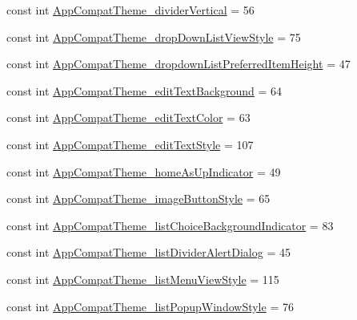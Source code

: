 \begin{DoxyCompactItemize}
\item 
const int \mbox{\hyperlink{class_f_w_p_s___app_1_1_droid_1_1_resource_1_1_styleable_a70f58c052478aade46a7b1e386130b65}{App\+Compat\+Theme\+\_\+divider\+Vertical}} = 56
\item 
const int \mbox{\hyperlink{class_f_w_p_s___app_1_1_droid_1_1_resource_1_1_styleable_ada67ea1a5af4f4efebdfa47a5ff276b2}{App\+Compat\+Theme\+\_\+drop\+Down\+List\+View\+Style}} = 75
\item 
const int \mbox{\hyperlink{class_f_w_p_s___app_1_1_droid_1_1_resource_1_1_styleable_a87d64a1aeff0163acd3010a12c33afe1}{App\+Compat\+Theme\+\_\+dropdown\+List\+Preferred\+Item\+Height}} = 47
\item 
const int \mbox{\hyperlink{class_f_w_p_s___app_1_1_droid_1_1_resource_1_1_styleable_a04dbe0ad4911a9a48e3a5ec680164e4c}{App\+Compat\+Theme\+\_\+edit\+Text\+Background}} = 64
\item 
const int \mbox{\hyperlink{class_f_w_p_s___app_1_1_droid_1_1_resource_1_1_styleable_a1ebf1fe735ff9d4768ccfa0d90905de7}{App\+Compat\+Theme\+\_\+edit\+Text\+Color}} = 63
\item 
const int \mbox{\hyperlink{class_f_w_p_s___app_1_1_droid_1_1_resource_1_1_styleable_a0c88dd65b286529c4b467fe96f134ddf}{App\+Compat\+Theme\+\_\+edit\+Text\+Style}} = 107
\item 
const int \mbox{\hyperlink{class_f_w_p_s___app_1_1_droid_1_1_resource_1_1_styleable_a891957c41d2b8f9e8307b36019059f21}{App\+Compat\+Theme\+\_\+home\+As\+Up\+Indicator}} = 49
\item 
const int \mbox{\hyperlink{class_f_w_p_s___app_1_1_droid_1_1_resource_1_1_styleable_ab11bc996ed4bd42fb75cdd2f4f9315e3}{App\+Compat\+Theme\+\_\+image\+Button\+Style}} = 65
\item 
const int \mbox{\hyperlink{class_f_w_p_s___app_1_1_droid_1_1_resource_1_1_styleable_aed4a8069cfa4a8a863ca17b25e69c421}{App\+Compat\+Theme\+\_\+list\+Choice\+Background\+Indicator}} = 83
\item 
const int \mbox{\hyperlink{class_f_w_p_s___app_1_1_droid_1_1_resource_1_1_styleable_a5cf3b9ccbe2916aba40144aba374c139}{App\+Compat\+Theme\+\_\+list\+Divider\+Alert\+Dialog}} = 45
\item 
const int \mbox{\hyperlink{class_f_w_p_s___app_1_1_droid_1_1_resource_1_1_styleable_af664cb0e31e549a6e812652781eb8400}{App\+Compat\+Theme\+\_\+list\+Menu\+View\+Style}} = 115
\item 
const int \mbox{\hyperlink{class_f_w_p_s___app_1_1_droid_1_1_resource_1_1_styleable_ab2f7556829ae3d6ba5fa874880ccf39b}{App\+Compat\+Theme\+\_\+list\+Popup\+Window\+Style}} = 76

\end{DoxyCompactItemize}
